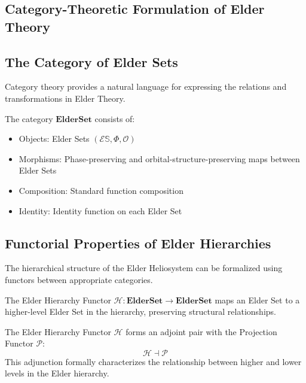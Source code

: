 \begin{theorem}
\begin{definition}
\begin{definition}
\begin{enumerate}
\section{Category-Theoretic Formulation of Elder Theory}

\subsection{The Category of Elder Sets}

Category theory provides a natural language for expressing the relations and transformations in Elder Theory.

\begin{definition}
The category $\mathbf{ElderSet}$ consists of:
\begin{itemize}
    \item Objects: Elder Sets $(\mathcal{E}\mathbb{S}, \Phi, \mathcal{O})$
    \item Morphisms: Phase-preserving and orbital-structure-preserving maps between Elder Sets
    \item Composition: Standard function composition
    \item Identity: Identity function on each Elder Set
\end{itemize}
\end{definition}

\subsection{Functorial Properties of Elder Hierarchies}

The hierarchical structure of the Elder Heliosystem can be formalized using functors between appropriate categories.

\begin{definition}
The Elder Hierarchy Functor $\mathcal{H}: \mathbf{ElderSet} \to \mathbf{ElderSet}$ maps an Elder Set to a higher-level Elder Set in the hierarchy, preserving structural relationships.
\end{definition}

\begin{theorem}
The Elder Hierarchy Functor $\mathcal{H}$ forms an adjoint pair with the Projection Functor $\mathcal{P}$:
\begin{equation}
\mathcal{H} \dashv \mathcal{P}
\end{equation}
This adjunction formally characterizes the relationship between higher and lower levels in the Elder hierarchy.
\end{theorem}


\end{enumerate}
\end{definition}
\end{definition}
\end{theorem}
